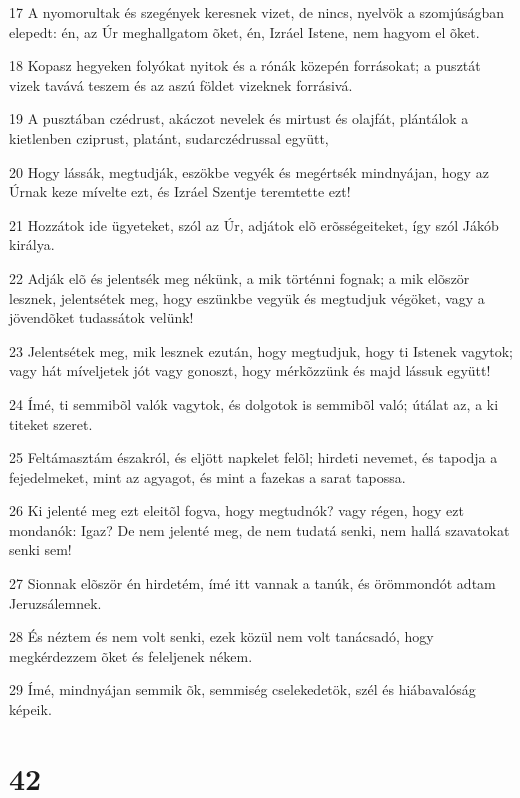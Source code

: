 \par 17 A nyomorultak és szegények keresnek vizet, de nincs, nyelvök a szomjúságban elepedt: én, az Úr meghallgatom õket, én, Izráel Istene, nem hagyom el õket.
\par 18 Kopasz hegyeken folyókat nyitok és a rónák közepén forrásokat; a pusztát vizek tavává teszem és az aszú földet vizeknek forrásivá.
\par 19 A pusztában czédrust, akáczot nevelek és mirtust és olajfát, plántálok a kietlenben cziprust, platánt, sudarczédrussal együtt,
\par 20 Hogy lássák, megtudják, eszökbe vegyék és megértsék mindnyájan, hogy az Úrnak keze mívelte ezt, és Izráel Szentje teremtette ezt!
\par 21 Hozzátok ide ügyeteket, szól az Úr, adjátok elõ erõsségeiteket, így szól Jákób királya.
\par 22 Adják elõ és jelentsék meg nékünk, a mik történni fognak; a mik elõször lesznek, jelentsétek meg, hogy eszünkbe vegyük és megtudjuk végöket, vagy a jövendõket tudassátok velünk!
\par 23 Jelentsétek meg, mik lesznek ezután, hogy megtudjuk, hogy ti Istenek vagytok; vagy hát míveljetek jót vagy gonoszt, hogy mérkõzzünk és majd lássuk együtt!
\par 24 Ímé, ti semmibõl valók vagytok, és dolgotok is semmibõl való; útálat az, a ki titeket szeret.
\par 25 Feltámasztám északról, és eljött napkelet felõl; hirdeti nevemet, és tapodja a fejedelmeket, mint az agyagot, és mint a fazekas a sarat tapossa.
\par 26 Ki jelenté meg ezt eleitõl fogva, hogy megtudnók? vagy régen, hogy ezt mondanók: Igaz? De nem jelenté meg, de nem tudatá senki, nem hallá szavatokat senki sem!
\par 27 Sionnak elõször én hirdetém, ímé itt vannak a tanúk, és örömmondót adtam Jeruzsálemnek.
\par 28 És néztem és nem volt senki, ezek közül nem volt tanácsadó, hogy megkérdezzem õket és feleljenek nékem.
\par 29 Ímé, mindnyájan semmik õk, semmiség cselekedetök, szél és hiábavalóság képeik.

\chapter{42}

